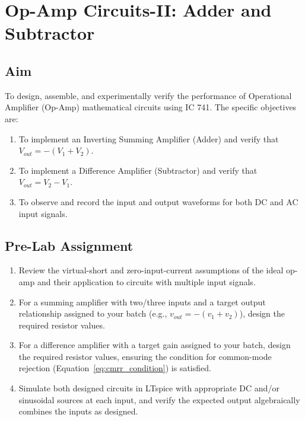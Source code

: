 %

\chapter{Op-Amp Circuits-II: Adder and Subtractor}

\section{Aim}
To design, assemble, and experimentally verify the performance of Operational Amplifier (Op-Amp) mathematical circuits using IC 741. The specific objectives are:
\begin{enumerate}
	\item To implement an Inverting Summing Amplifier (Adder) and verify that $V_{out} = -(V_1 + V_2)$.
	\item To implement a Difference Amplifier (Subtractor) and verify that $V_{out} = V_2 - V_1$.
	\item To observe and record the input and output waveforms for both DC and AC input signals.
\end{enumerate}

\section{Pre-Lab Assignment}
\begin{enumerate}
	\item Review the virtual-short and zero-input-current assumptions of the ideal op-amp and their application to circuits with multiple input signals.
	\item For a summing amplifier with two/three inputs and a target output relationship assigned to your batch (e.g., $v_{out} = -(v_1 + v_2)$), design the required resistor values.
	\item For a difference amplifier with a target gain assigned to your batch, design the required resistor values, ensuring the condition for common-mode rejection (Equation~\eqref{eq:cmrr_condition}) is satisfied.
	\item Simulate both designed circuits in LTspice with appropriate DC and/or sinusoidal sources at each input, and verify the expected output algebraically combines the inputs as designed.
\end{enumerate}

